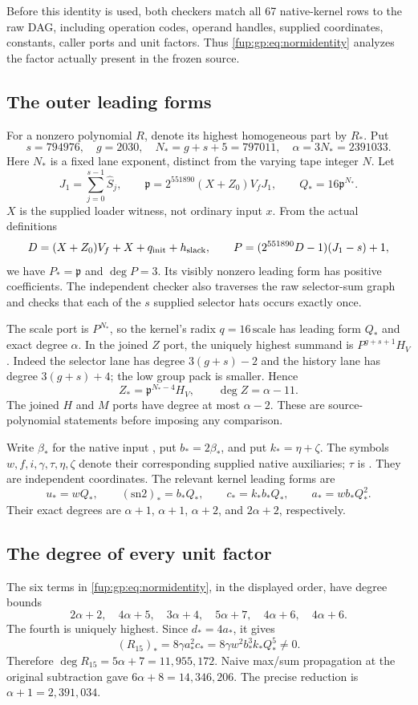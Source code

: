 \documentclass[11pt,letterpaper]{article}
\theoremstyle{definition}\newtheorem{definition}[theorem]{Definition}
\theoremstyle{remark}\newtheorem{remark}[theorem]{Remark}
\newcommand{\fname}[1]{\texttt{\small\detokenize{#1}}}
\begin{document}
Before this identity is used, both checkers match all 67 native-kernel rows to the raw DAG, including operation codes, operand handles, supplied coordinates, constants, caller ports and unit factors. Thus \eqref{fup:gp:eq:normidentity} analyzes the factor actually present in the frozen source.

\subsection{The outer leading forms}
For a nonzero polynomial $R$, denote its highest homogeneous part by $R_*$. Put
\[
 s=794976,\quad g=2030,\quad N_*=g+s+5=797011,
 \quad\alpha=3N_*=2391033.
\]
Here $N_*$ is a fixed lane exponent, distinct from the varying tape integer $N$. Let
\[
 J_1=\sum_{j=0}^{s-1}\widehat S_j,\qquad
 \mathfrak p=2^{551890}(X+Z_0)V_fJ_1,\qquad
 Q_*=16\mathfrak p^{N_*}.
\]
$X$ is the supplied loader witness, not ordinary input $x$. From the actual definitions
\[
 D=(X+Z_0)V_f+X+q_{\rm init}+h_{\rm slack},\qquad
 P=(2^{551890}D-1)(J_1-s)+1,
\]
we have $P_*=\mathfrak p$ and $\deg P=3$. Its visibly nonzero leading form has positive coefficients. The independent checker also traverses the raw selector-sum graph and checks that each of the $s$ supplied selector hats occurs exactly once.

The scale port is $P^{N_*}$, so the kernel's radix $q=16\,\mathrm{scale}$ has leading form $Q_*$ and exact degree $\alpha$. In the joined $Z$ port, the uniquely highest summand is $P^{g+s+1}H_V$. Indeed the selector lane has degree $3(g+s)-2$ and the history lane has degree $3(g+s)+4$; the low group pack is smaller. Hence
\[
 Z_* = \mathfrak p^{N_*-4}H_V,\qquad \deg Z=\alpha-11.
\]
The joined $H$ and $M$ ports have degree at most $\alpha-2$. These are source-polynomial statements before imposing any comparison.

Write $\beta_*$ for the native input \fname{and__odd_half}, put $b_*=2\beta_*$, and put $k_*=\eta+\zeta$. The symbols $w,f,i,\gamma,\tau,\eta,\zeta$ denote their corresponding supplied native auxiliaries; $\tau$ is \fname{and__tau_gap}. They are independent coordinates. The relevant kernel leading forms are
\[
 u_*=wQ_*,\qquad (\mathrm{sn2})_*=b_*Q_*,\qquad
 c_*=k_*b_*Q_*,\qquad a_*=wb_*Q_*^2.
\]
Their exact degrees are $\alpha+1$, $\alpha+1$, $\alpha+2$, and $2\alpha+2$, respectively.

\subsection{The degree of every unit factor}
The six terms in \eqref{fup:gp:eq:normidentity}, in the displayed order, have degree bounds
\[
 2\alpha+2,\quad4\alpha+5,\quad3\alpha+4,\quad
 5\alpha+7,\quad4\alpha+6,\quad4\alpha+6.
\]
The fourth is uniquely highest. Since $d_*=4a_*$, it gives
\[
 (R_{15})_*=8\gamma a_*^2c_*
           =8\gamma w^2b_*^3k_*Q_*^5\ne0.
\]
Therefore $\deg R_{15}=5\alpha+7=11,955,172$. Naive max/sum propagation at the original subtraction gave $6\alpha+8=14,346,206$. The precise reduction is $\alpha+1=2,391,034$.
\end{document}

